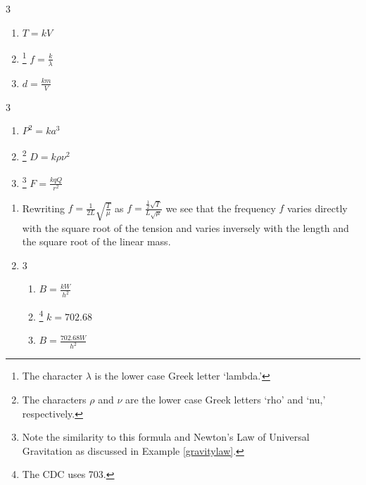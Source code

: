 \documentclass{ximera}
\begin{document}
	\author{Stitz-Zeager}


\begin{multicols}{3}
\begin{enumerate}

\item $T = k V$

\item \hspace{-.1in} \footnote{The character $\lambda$ is the lower case Greek letter `lambda.'} $f = \frac{k}{\lambda}$

\item $d = \frac{k m}{V}$ 

\setcounter{HW}{\value{enumi}}
\end{enumerate}
\end{multicols}


\begin{multicols}{3}
\begin{enumerate}
\setcounter{enumi}{\value{HW}}

\item $P^2 = k a^3$

\item \hspace{-.1in} \footnote{The characters $\rho$ and $\nu$ are the lower case Greek letters `rho' and `nu,' respectively.} $D = k \rho \nu^2$

\item \hspace{-.1in} \footnote{Note the similarity to this formula and Newton's Law of Universal Gravitation as discussed in Example \ref{gravitylaw}.}  $F = \frac{kqQ}{r^2}$   

\setcounter{HW}{\value{enumi}}
\end{enumerate}
\end{multicols}

\begin{enumerate}
\setcounter{enumi}{\value{HW}}

\item Rewriting $f = \frac{1}{2L} \sqrt{\frac{T}{\mu}}$ as $f = \frac{\frac{1}{2} \sqrt{T}}{L \sqrt{\mu}}$ we see that the frequency $f$ varies directly with the square root of the tension and varies inversely with the length and the square root of the linear mass.

\item \begin{multicols}{3} 
\begin{enumerate}
\item $B = \frac{kW}{h^{2}}$
\item \hspace{-.1in} \footnote{The CDC uses 703.} $k = 702.68$ 
\item $B = \frac{702.68W}{h^{2}}$
\end{enumerate}
\end{multicols}

\end{enumerate}
\end{document}
